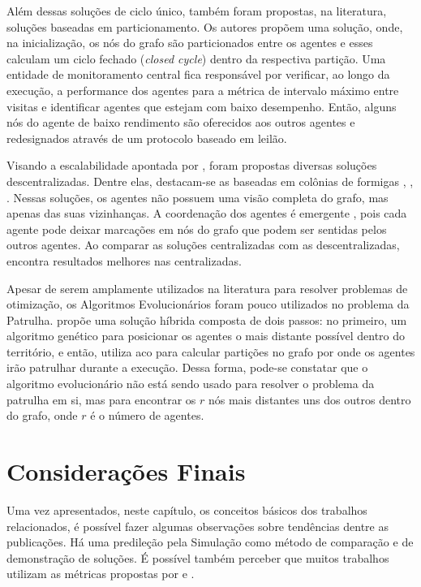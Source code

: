 Além dessas soluções de ciclo único, também foram propostas, na literatura, 
soluções baseadas em particionamento. Os autores 
\citep{Pippin:2013:PBT:2480362.2480378} propõem uma solução, onde, na 
inicialização, os nós do grafo são particionados entre os agentes e esses 
calculam um ciclo fechado (\textit{closed cycle}) dentro da respectiva partição. 
Uma entidade de monitoramento central fica responsável por verificar, ao longo 
da execução, a performance dos agentes para a métrica de intervalo máximo entre 
visitas e identificar agentes que estejam com baixo desempenho. Então, alguns 
nós do agente de baixo rendimento são oferecidos aos outros agentes e 
redesignados através de um protocolo baseado em leilão.

Visando a escalabilidade apontada por \citep{Almeida:2004:AAI}, foram propostas 
diversas soluções descentralizadas. Dentre elas, destacam-se as baseadas em 
colônias de formigas \citep{Koenig:2001:TCA:375735.376463}, 
\citep{Elor:2010:AMC:1884958.1884970}, \citep{6615158}. Nessas soluções, os 
agentes não possuem uma visão completa do grafo, mas apenas das suas 
vizinhanças. A coordenação dos agentes é emergente 
\citep{Machado:2002:MPE:1765317.1765332}, pois cada agente pode deixar marcações 
em nós do grafo que podem ser sentidas pelos outros agentes. Ao comparar as 
soluções centralizadas com as descentralizadas, \citep{Almeida:2004:AAI} 
encontra resultados melhores nas centralizadas.

Apesar de serem amplamente utilizados na literatura para resolver problemas de 
otimização, os Algoritmos Evolucionários \citep{Luke2013Metaheuristics} foram 
pouco utilizados no problema da Patrulha. \citep{4630897} propõe uma solução 
híbrida composta de dois passos: no primeiro, um algoritmo genético para 
posicionar os agentes o mais distante possível dentro do território, e então, 
utiliza \ac{aco} para calcular partições no grafo por onde os agentes irão 
patrulhar durante a execução. Dessa forma, pode-se constatar que o algoritmo 
evolucionário não está sendo usado para resolver o problema da patrulha em si, 
mas para encontrar os $r$ nós mais distantes uns dos outros dentro do grafo, 
onde $r$ é o número de agentes.

\section{Considerações Finais}

Uma vez apresentados, neste capítulo, os conceitos básicos dos trabalhos 
relacionados, é possível fazer algumas observações sobre tendências dentre as 
publicações. Há uma predileção pela Simulação como método de comparação e de 
demonstração de soluções. É possível também perceber que muitos trabalhos 
utilizam as métricas propostas por \citep{Machado:2002:MPE:1765317.1765332} e 
\citep{sampaiophd}.


